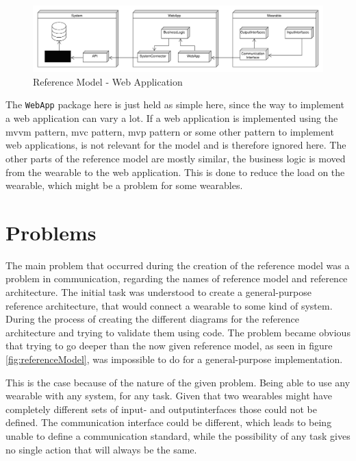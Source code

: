 \begin{figure}[H]
	\includegraphics[width=\linewidth]{images/PackageModel_ReferenceArchitecture_WebApp}
	\caption{Reference Model - Web Application}
	\label{fig:referenceModel_WebApp}
\end{figure}

The \texttt{WebApp} package here is just held as simple here, since the way to implement a web application can vary a lot. If a web application is implemented using the \gls{mvvm} pattern, \gls{mvc} pattern, \gls{mvp} pattern or some other pattern to implement web applications, is not relevant for the model and is therefore ignored here. The other parts of the reference model are mostly similar, the business logic is moved from the wearable to the web application. This is done to reduce the load on the wearable, which might be a problem for some wearables.

\section{Problems}
The main problem that occurred during the creation of the \gls{reference model} was a problem in communication, regarding the names of \gls{reference model} and \gls{reference architecture}. The initial task was understood to create a general-purpose \gls{reference architecture}, that would connect a \gls{wearable} to some kind of system. During the process of creating the different diagrams for the reference architecture and trying to validate them using code. The problem became obvious that trying to go deeper than the now given \gls{reference model}, as seen in figure \ref{fig:referenceModel}, was impossible to do for a general-purpose implementation.

This is the case because of the nature of the given problem. Being able to use any wearable with any system, for any task. Given that two wearables might have completely different sets of input- and outputinterfaces those could not be defined. The communication interface could be different, which leads to being unable to define a communication standard, while the possibility of any task gives no single action that will always be the same.